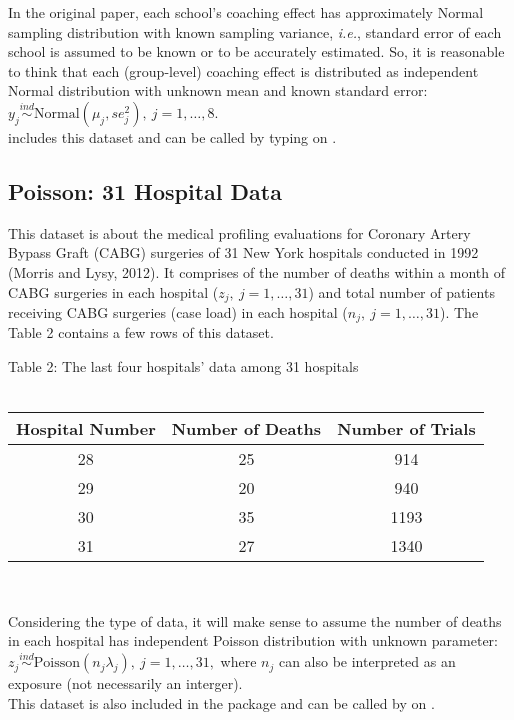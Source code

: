 \documentclass[article]{jss}
\begin{document}
In the original paper, each school's coaching effect has approximately Normal sampling distribution with known sampling variance, \emph{i.e.}, standard error of each school is assumed to be known or to be accurately estimated. So, it is reasonable to think that each (group-level) coaching effect is distributed as independent Normal distribution with unknown mean and known standard error:  $y_{j}\stackrel{ind}{\sim} \textrm{Normal}(\mu_{j}, se^{2}_{j}),~ j=1, \ldots, 8$.
\\

 includes this dataset and can be called by typing  on .

\subsection{Poisson: 31 Hospital Data}
This dataset is about the medical profiling evaluations for Coronary Artery Bypass Graft (CABG) surgeries of 31 New York hospitals conducted in 1992 (Morris and Lysy, 2012). It comprises of the number of deaths within a month of CABG surgeries in each hospital ($z_{j},~j=1, \ldots, 31$) and total number of patients receiving CABG surgeries (case load) in each hospital ($n_{j},~j=1, \ldots, 31$). The Table 2 contains a few rows of this dataset.
\begin{center}
Table 2: The last four hospitals' data among 31 hospitals
\\
~
\\
\begin{tabular}{|c|c|c|}
\hline
Hospital Number & Number of Deaths & Number of Trials\\
\hline
28 & 25 & 914\\
\hline
29 & 20 & 940\\
\hline
30 & 35 & 1193\\
\hline
31 & 27 & 1340\\
\hline
\end{tabular}
\end{center}
~

Considering the type of data, it will make sense to assume the number of deaths in each hospital has independent Poisson distribution with unknown parameter: $z_{j}\stackrel{ind}{\sim} \textrm{Poisson}(n_{j}\lambda_{j}), ~j=1, \ldots, 31,$ where $n_{j}$ can also be interpreted as an exposure (not necessarily an interger).
\\

This dataset is also included in the package and can be called by  on .
\end{document}
